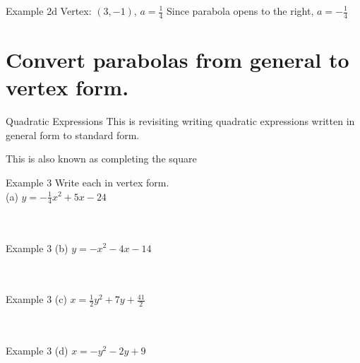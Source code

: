 \documentclass[t]{beamer}
\begin{document}
\begin{frame}{Example 2d \quad Vertex: $(3,-1)$, $a = \tfrac{1}{4}$}
Since parabola opens to the right, $a = -\frac{1}{4}$	\\[11pt]
\end{frame}


\section{Convert parabolas from general to vertex form.}

\begin{frame}{Quadratic Expressions}
This is revisiting writing quadratic expressions written in general form to standard form. 	\newline\\	\pause

This is also known as \alert{completing the square}
\end{frame}

\begin{frame}{Example 3}
Write each in vertex form.	\newline\\
(a)	\quad $y = -\frac{1}{4}x^2 + 5x - 24$	\newline\\
 \newline\\
 \newline\\
\end{frame}

\begin{frame}{Example 3}
(b)	\quad $y = -x^2-4x-14$	\newline\\
 \newline\\
 \newline\\
\end{frame}

\begin{frame}{Example 3}
(c)	\quad $x=\frac{1}{2}y^2+7y+\frac{41}{2}$	\newline\\
 \newline\\
 \newline\\
\end{frame}

\begin{frame}{Example 3}
(d)	\quad $x=-y^2-2y+9$	\newline\\
 \newline\\
 \newline\\
\end{frame}
\end{document}
